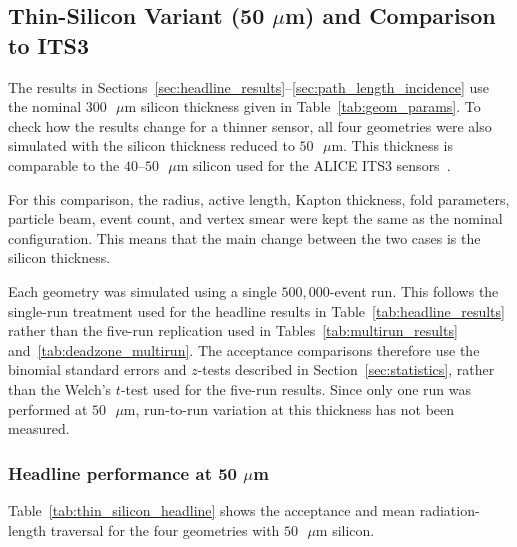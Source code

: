\documentclass[a4paper,11pt]{article}
\begin{document}
\subsection{Thin-Silicon Variant (50 \texorpdfstring{$\mu$}{u}m) and Comparison to ITS3}
\label{sec:thin_silicon}

The results in Sections~\ref{sec:headline_results}--\ref{sec:path_length_incidence} use the nominal $300\text{ }\mu\text{m}$ silicon thickness given in Table~\ref{tab:geom_params}. To check how the results change for a thinner sensor, all four geometries were also simulated with the silicon thickness reduced to $50\text{ }\mu\text{m}$. This thickness is comparable to the $40$--$50\text{ }\mu\text{m}$ silicon used for the ALICE ITS3 sensors~\cite{ALICE2024, Sonneveld2023}.

For this comparison, the radius, active length, Kapton thickness, fold parameters, particle beam, event count, and vertex smear were kept the same as the nominal configuration. This means that the main change between the two cases is the silicon thickness.

Each geometry was simulated using a single $500{,}000$-event run. This follows the single-run treatment used for the headline results in Table~\ref{tab:headline_results} rather than the five-run replication used in Tables~\ref{tab:multirun_results} and~\ref{tab:deadzone_multirun}. The acceptance comparisons therefore use the binomial standard errors and $z$-tests described in Section~\ref{sec:statistics}, rather than the Welch's $t$-test used for the five-run results. Since only one run was performed at $50\text{ }\mu\text{m}$, run-to-run variation at this thickness has not been measured.

\subsubsection{Headline performance at 50 \texorpdfstring{$\mu$}{u}m}

Table~\ref{tab:thin_silicon_headline} shows the acceptance and mean radiation-length traversal for the four geometries with $50\text{ }\mu\text{m}$ silicon.
\end{document}
